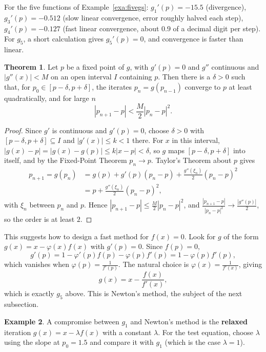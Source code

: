 \documentclass[11pt,a4paper]{article}
\numberwithin{equation}{section}
\theoremstyle{definition}
\newtheorem{thm}{Theorem}[subsection]
\newtheorem{exa}[thm]{Example}
\begin{document}
For the five functions of Example~\ref{exa:fivegs}: $g_1'(p) = -15.5$ (divergence), $g_3'(p) = -0.512$ (slow linear convergence, error
roughly halved each step), $g_4'(p) = -0.127$ (fast linear convergence, about $0.9$ of a decimal digit per step). For $g_5$, a short
calculation gives $g_5'(p) = 0$, and convergence is faster than linear.

\begin{thm}
\label{thm:fpquad}
Let $p$ be a fixed point of $g$, with $g'(p) = 0$ and $g''$ continuous and $|g''(x)|<M$ on an open interval $I$ containing $p$. Then there
is a $\delta>0$ such that, for $p_0\in[p-\delta,p+\delta]$, the iterates $p_n = g(p_{n-1})$ converge to $p$ at least quadratically, and
for large $n$
$$|p_{n+1}-p|<\frac{M}{2}|p_n-p|^2 .$$
\end{thm}

\begin{proof}
Since $g'$ is continuous and $g'(p) = 0$, choose $\delta>0$ with $[p-\delta,p+\delta]\subseteq I$ and $|g'(x)|\leq k<1$ there. For $x$ in
this interval, $|g(x)-p| = |g(x)-g(p)|\leq k|x-p|<\delta$, so $g$ maps $[p-\delta,p+\delta]$ into itself, and by the Fixed-Point Theorem
$p_n\longrightarrow p$. Taylor's Theorem about $p$ gives
\begin{align*}
p_{n+1} = g(p_n) &= g(p)+g'(p)(p_n-p)+\frac{g''(\xi_n)}{2}(p_n-p)^2\\
&= p+\frac{g''(\xi_n)}{2}(p_n-p)^2,
\end{align*}
with $\xi_n$ between $p_n$ and $p$. Hence $|p_{n+1}-p|\leq\frac M2|p_n-p|^2$, and $\frac{|p_{n+1}-p|}{|p_n-p|^2}\longrightarrow\frac{|g''(p)|}{2}$, so the
order is at least $2$.
\end{proof}

This suggests how to design a fast method for $f(x) = 0$. Look for $g$ of the form $g(x) = x-\varphi(x)f(x)$ with $g'(p) = 0$. Since
$f(p) = 0$,
$$g'(p) = 1-\varphi'(p)f(p)-\varphi(p)f'(p) = 1-\varphi(p)f'(p),$$
which vanishes when $\varphi(p) = \frac{1}{f'(p)}$. The natural choice is $\varphi(x) = \frac1{f'(x)}$, giving
$$g(x) = x-\frac{f(x)}{f'(x)},$$
which is exactly $g_5$ above. This is Newton's method, the subject of the next subsection.

\begin{exa}
\label{exa:relax}
A compromise between $g_1$ and Newton's method is the \textbf{relaxed} iteration $g(x) = x-\lambda f(x)$ with a constant $\lambda$. For the
test equation, choose $\lambda$ using the slope at $p_0 = 1.5$ and compare it with $g_1$ (which is the case $\lambda = 1$).
\end{exa}
\end{document}

